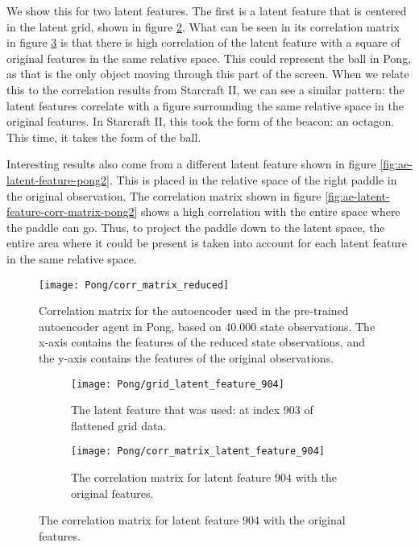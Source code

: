 We show this for two latent features. The first is a latent feature that is centered in the latent grid, shown in figure \ref{fig:ae-latent-feature-pong}. What can be seen in its correlation matrix in figure \ref{fig:ae-latent-feature-corr-matrix-pong} is that there is high correlation of the latent feature with a square of original features in the same relative space. This could represent the ball in Pong, as that is the only object moving through this part of the screen. When we relate this to the correlation results from Starcraft II, we can see a similar pattern: the latent features correlate with a figure surrounding the same relative space in the original features. In Starcraft II, this took the form of the beacon: an octagon. This time, it takes the form of the ball.

Interesting results also come from a different latent feature shown in figure \ref{fig:ae-latent-feature-pong2}. This is placed in the relative space of the right paddle in the original observation. The correlation matrix shown in figure \ref{fig:ae-latent-feature-corr-matrix-pong2} shows a high correlation with the entire space where the paddle can go. Thus, to project the paddle down to the latent space, the entire area where it could be present is taken into account for each latent feature in the same relative space.

\begin{figure}[h]
	\centering
	\texttt{[image: Pong/corr\_matrix\_reduced]}
	\caption{Correlation matrix for the autoencoder used in the pre-trained autoencoder agent in Pong, based on $40.000$ state observations. The x-axis contains the features of the reduced state observations, and the y-axis contains the features of the original observations.}
	\label{fig:ae-corr-pong}
\end{figure}

\begin{figure}[h]
	\centering
	\begin{subfigure}[b]{0.2\textwidth}
		\texttt{[image: Pong/grid\_latent\_feature\_904]}
		\caption{The latent feature that was used: at index $903$ of flattened grid data.}
		\label{fig:ae-latent-feature-pong} 
	\end{subfigure}\hfill
	\begin{subfigure}[b]{0.75\textwidth}
		\texttt{[image: Pong/corr\_matrix\_latent\_feature\_904]}
		\caption{The correlation matrix for latent feature $904$ with the original features.}
		\label{fig:ae-latent-feature-corr-matrix-pong}
	\end{subfigure}
	\caption{The correlation matrix for latent feature $904$ with the original features.}
	\label{fig:latent-feature-corr-pong}
\end{figure}

